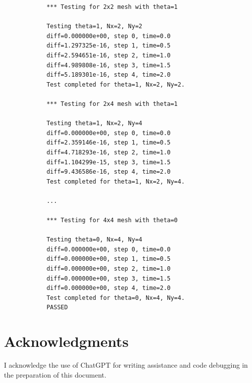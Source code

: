 \documentclass{article}
\begin{document}
		\begin{lstlisting}
			*** Testing for 2x2 mesh with theta=1
			
			Testing theta=1, Nx=2, Ny=2
			diff=0.000000e+00, step 0, time=0.0
			diff=1.297325e-16, step 1, time=0.5
			diff=2.594651e-16, step 2, time=1.0
			diff=4.989808e-16, step 3, time=1.5
			diff=5.189301e-16, step 4, time=2.0
			Test completed for theta=1, Nx=2, Ny=2.
			
			*** Testing for 2x4 mesh with theta=1
			
			Testing theta=1, Nx=2, Ny=4
			diff=0.000000e+00, step 0, time=0.0
			diff=2.359146e-16, step 1, time=0.5
			diff=4.718293e-16, step 2, time=1.0
			diff=1.104299e-15, step 3, time=1.5
			diff=9.436586e-16, step 4, time=2.0
			Test completed for theta=1, Nx=2, Ny=4.
			
			...
			
			*** Testing for 4x4 mesh with theta=0
			
			Testing theta=0, Nx=4, Ny=4
			diff=0.000000e+00, step 0, time=0.0
			diff=0.000000e+00, step 1, time=0.5
			diff=0.000000e+00, step 2, time=1.0
			diff=0.000000e+00, step 3, time=1.5
			diff=0.000000e+00, step 4, time=2.0
			Test completed for theta=0, Nx=4, Ny=4.
			PASSED
		\end{lstlisting}
		
		
		
	\newpage
	\section*{Acknowledgments}
	
	I acknowledge the use of ChatGPT for writing assistance and code debugging in the preparation of this document.
	
			
		
	
		
			
		
		
\end{document}
